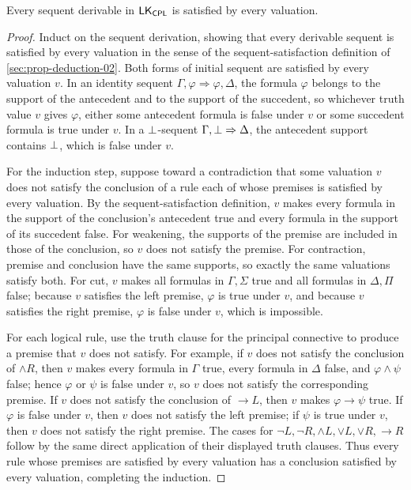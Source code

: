 \begin{theorem}
\label{thm:prop-lk-soundness}
Every sequent derivable in \(\mathsf{LK}_{\mathsf{CPL}}\) is satisfied by every valuation.
\end{theorem}
\begin{proof}
Induct on the sequent derivation, showing that every derivable sequent is
satisfied by every valuation in the sense of the sequent-satisfaction
definition of \cref{sec:prop-deduction-02}.  Both forms of initial sequent
are satisfied by every valuation \(v\).  In an identity sequent
\(\Gamma,\varphi\Rightarrow\varphi,\Delta\), the formula \(\varphi\)
belongs to the support of the antecedent and to the support of the
succedent, so whichever truth value \(v\) gives \(\varphi\), either some
antecedent formula is false under \(v\) or some succedent formula is true
under \(v\).  In a \(\bot\)-sequent
\(\Gamma,\bot\Rightarrow\Delta\), the antecedent support contains
\(\bot\), which is false under \(v\).

For the induction step, suppose toward a contradiction that some valuation
\(v\) does not satisfy the conclusion of a rule each of whose premises is
satisfied by every valuation.  By the sequent-satisfaction definition,
\(v\) makes every formula in the support of the conclusion's antecedent
true and every formula in the support of its succedent false.  For
weakening, the supports of the premise are included in those of the
conclusion, so \(v\) does not satisfy the premise.  For contraction,
premise and conclusion have the same supports, so exactly the same
valuations satisfy both.  For cut, \(v\) makes all formulas in
\(\Gamma,\Sigma\) true and all formulas in \(\Delta,\Pi\) false; because
\(v\) satisfies the left premise, \(\varphi\) is true under \(v\), and
because \(v\) satisfies the right premise, \(\varphi\) is false under
\(v\), which is impossible.

For each logical rule, use the truth clause for the principal connective to
produce a premise that \(v\) does not satisfy.  For example, if \(v\)
does not satisfy the conclusion of \(\land R\), then \(v\) makes every
formula in \(\Gamma\) true, every formula in \(\Delta\) false, and
\(\varphi\land\psi\) false; hence \(\varphi\) or \(\psi\) is false under
\(v\), so \(v\) does not satisfy the corresponding premise.  If \(v\)
does not satisfy the conclusion of \(\to L\), then \(v\) makes
\(\varphi\to\psi\) true.  If \(\varphi\) is false under \(v\), then
\(v\) does not satisfy the left premise; if \(\psi\) is true under
\(v\), then \(v\) does not satisfy the right premise.  The cases for
\(\neg L,\neg R,\land L,\lor L,\lor R,\to R\) follow by the same direct
application of their displayed truth clauses.  Thus every rule whose
premises are satisfied by every valuation has a conclusion satisfied by
every valuation, completing the induction.
\end{proof}

